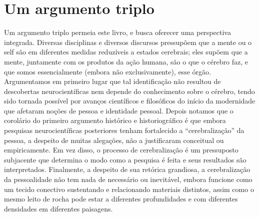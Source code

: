 \section{Um argumento triplo}

Um argumento triplo permeia este livro, e busca oferecer uma perspectiva
integrada. Diversas disciplinas e diversos discursos pressupõem que a
mente ou o self são em diferentes medidas reduzíveis a estados
cerebrais; eles supõem que a mente, juntamente com os produtos da ação
humana, são o que o cérebro faz, e que somos essencialmente (embora não
exclusivamente), esse órgão. Argumentamos em primeiro lugar que tal
identificação não resultou de descobertas neurocientíficas nem depende
do conhecimento sobre o cérebro, tendo sido tornada possível por avanços
científicos e filosóficos do início da modernidade que afetaram noções
de pessoa e identidade pessoal. Depois notamos que o corolário do
primeiro argumento histórico e historiográfico é que embora pesquisas
neurocientíficas posteriores tenham fortalecido a ``cerebralização'' da
pessoa, a despeito de muitas alegações, não a justificaram conceitual ou
empiricamente. Em vez disso, o processo de cerebralização é um
pressuposto subjacente que determina o modo como a pesquisa é feita e
seus resultados são interpretados. Finalmente, a despeito de sua
retórica grandiosa, a cerebralização da pessoalidade não tem nada de
necessário ou inevitável, embora funcione como um tecido conectivo
sustentando e relacionando materiais distintos, assim como o mesmo leito
de rocha pode estar a diferentes profundidades e com diferentes
densidades em diferentes paisagens.

